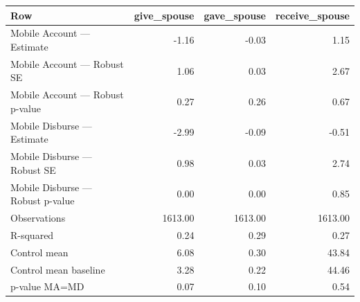 
\begin{tabular}{lrrr}
\toprule
Row & give\_spouse & gave\_spouse & receive\_spouse\\
\midrule
Mobile Account — Estimate & -1.16 & -0.03 & 1.15\\
Mobile Account — Robust SE & 1.06 & 0.03 & 2.67\\
Mobile Account — Robust p-value & 0.27 & 0.26 & 0.67\\
Mobile Disburse — Estimate & -2.99 & -0.09 & -0.51\\
Mobile Disburse — Robust SE & 0.98 & 0.03 & 2.74\\
\addlinespace
Mobile Disburse — Robust p-value & 0.00 & 0.00 & 0.85\\
Observations & 1613.00 & 1613.00 & 1613.00\\
R-squared & 0.24 & 0.29 & 0.27\\
Control mean & 6.08 & 0.30 & 43.84\\
Control mean baseline & 3.28 & 0.22 & 44.46\\
\addlinespace
p-value MA=MD & 0.07 & 0.10 & 0.54\\
\bottomrule
\end{tabular}
